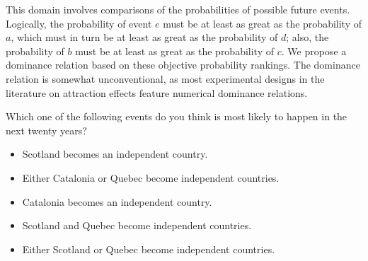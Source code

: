 This domain involves comparisons of the probabilities of possible future events.
Logically, the probability of event $e$ must be at least as great as the probability of $a$, which must in turn be at least as great as the probability of $d$; also, the probability of $b$ must be at least as great as the probability of $c$.
We propose a dominance relation based on these objective probability rankings.
The dominance relation is somewhat unconventional, as most experimental designs in the literature on attraction effects feature numerical dominance relations.
{}
\begin{tcolorbox}
Which one of the following events do you think is most likely to happen in the next twenty years?

\begin{itemize}
	\item Scotland becomes an independent country.
	\item Either Catalonia or Quebec become independent countries.
	\item Catalonia becomes an independent country.
	\item Scotland and Quebec become independent countries.
	\item Either Scotland or Quebec become independent countries.
\end{itemize}
\end{tcolorbox}
